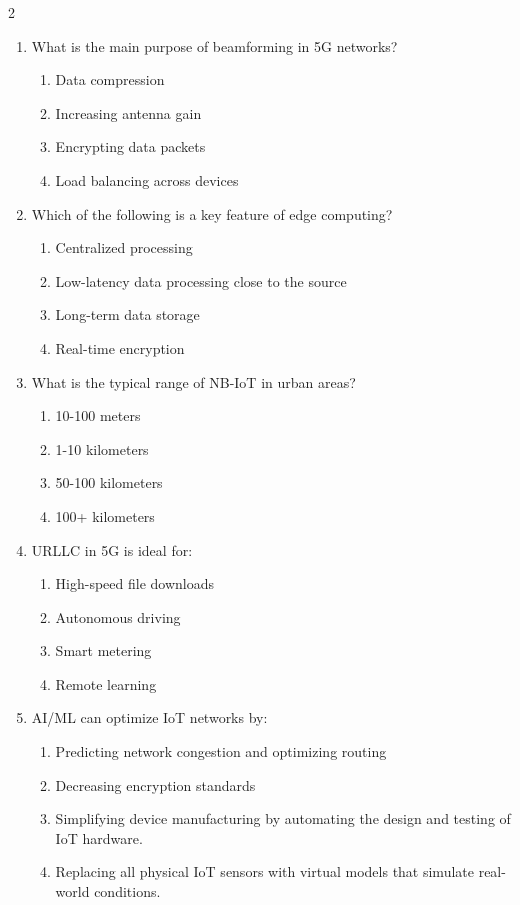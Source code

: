 \begin{multicols}{2}
\begin{enumerate}
    \item What is the main purpose of beamforming in 5G networks?
    \begin{enumerate}
        \item Data compression
        \item Increasing antenna gain
        \item Encrypting data packets
        \item Load balancing across devices
    \end{enumerate}
    
    \item Which of the following is a key feature of edge computing?
    \begin{enumerate}
        \item Centralized processing
        \item Low-latency data processing close to the source
        \item Long-term data storage
        \item Real-time encryption
    \end{enumerate}

    \item What is the typical range of NB-IoT in urban areas?
    \begin{enumerate}
        \item 10-100 meters
        \item 1-10 kilometers
        \item 50-100 kilometers
        \item 100+ kilometers
    \end{enumerate}

    \item URLLC in 5G is ideal for:
    \begin{enumerate}
        \item High-speed file downloads
        \item Autonomous driving
        \item Smart metering
        \item Remote learning
    \end{enumerate}
    \newpage

    \item AI/ML can optimize IoT networks by:
    \begin{enumerate}
        \item Predicting network congestion and optimizing routing  
        \item Decreasing encryption standards
        \item Simplifying device manufacturing by automating the design and testing of IoT hardware.
        \item Replacing all physical IoT sensors with virtual models that simulate real-world conditions.
    \end{enumerate}


\end{enumerate}
\end{multicols}
